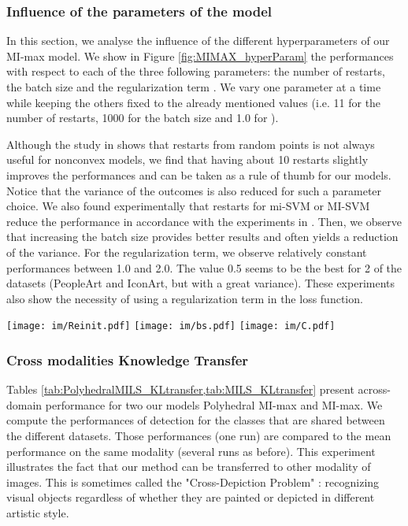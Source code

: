 \documentclass[preprint]{elsarticle}
\newcommand\MILS{MI-max}
\newcommand\MaxOfMaxS{Polyhedral MI-max}
\begin{document}
\subsubsection{Influence of the parameters of the model}
\label{sec:Param} 

In this section, we analyse the influence of the different hyperparameters of our \MILS{} model. We show in Figure \ref{fig:MIMAX_hyperParam} the performances with respect to each of the three following parameters: the number of restarts, the batch size and the regularization term . We vary one parameter at a time while keeping the others fixed to the already mentioned values (i.e. 11 for the number of restarts, 1000 for the batch size and 1.0 for ).

Although the study in \citep{doran_theoretical_2014} shows that restarts from random points is not always useful for nonconvex models, we find that having about 10 restarts slightly improves the performances and can be taken as a rule of thumb for our models. Notice that the variance of the outcomes is also reduced for such a parameter choice. 
We also found experimentally that restarts for mi-SVM or MI-SVM reduce the performance in accordance with the experiments in \citep{doran_theoretical_2014}. Then, we observe that increasing the batch size provides better results and often yields a reduction of the variance. 
For the regularization term, we observe relatively constant performances between 1.0 and 2.0. The value 0.5 seems to be the best for 2 of the datasets (PeopleArt and IconArt, but with a great variance). These experiments also show the necessity of using a regularization term in the loss function.


\begin{figure*}[h!]
\centering
  \hfill
     \texttt{[image: im/Reinit.pdf]}\hfill  
     \texttt{[image: im/bs.pdf]}\hfill
     \texttt{[image: im/C.pdf]}\hspace*{\fill} 
    \caption{Impact of the different hyperparameters on the \MILS{} model. Figure must be seen in color.}
    \label{fig:MIMAX_hyperParam}
\end{figure*}


\subsubsection{Cross modalities Knowledge Transfer}
\label{sec:KnowledgeTransfer_crossMod}

Tables \cref{tab:PolyhedralMILS_KLtransfer,tab:MILS_KLtransfer} present across-domain performance for two our models \MaxOfMaxS{} and \MILS{}. We compute the performances of detection for the classes that are shared between the different datasets. Those performances (one run) are compared to the mean performance on the same modality (several runs as before).
This experiment illustrates the fact that our method can be transferred to other modality of images. This is sometimes called the "Cross-Depiction Problem" \citep{hall_crossdepiction_2015}: recognizing visual objects regardless of whether they are painted or depicted in different artistic style.
\end{document}
